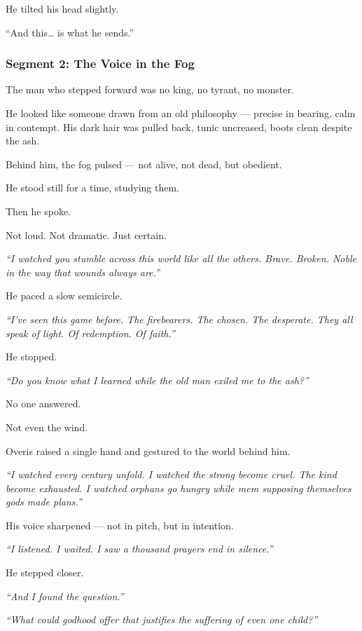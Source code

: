 \documentclass[9pt]{article}
\begin{document}
He tilted his head slightly.

“And this… is what he sends.”

\newpage

\subsubsection*{Segment 2: The Voice in the Fog}

The man who stepped forward was no king, no tyrant, no monster.

He looked like someone drawn from an old philosophy — precise in bearing, calm in contempt. His dark hair was pulled back, tunic uncreased, boots clean despite the ash.

Behind him, the fog pulsed — not alive, not dead, but obedient.

He stood still for a time, studying them.

Then he spoke.

Not loud. Not dramatic. Just certain.

\bigskip

\textit{“I watched you stumble across this world like all the others. Brave. Broken. Noble in the way that wounds always are.”}

He paced a slow semicircle.

\textit{“I’ve seen this game before. The firebearers. The chosen. The desperate. They all speak of light. Of redemption. Of faith.”}

He stopped.

\textit{“Do you know what I learned while the old man exiled me to the ash?”}

No one answered.

Not even the wind.

Overis raised a single hand and gestured to the world behind him.

\textit{“I watched every century unfold. I watched the strong become cruel. The kind become exhausted. I watched orphans go hungry while mem supposing themselves gods made plans.”}

His voice sharpened — not in pitch, but in intention.

\textit{“I listened. I waited. I saw a thousand prayers end in silence.”}

He stepped closer.

\textit{“And I found the question.”}

\textit{“What could godhood offer that justifies the suffering of even one child?”}
\end{document}
